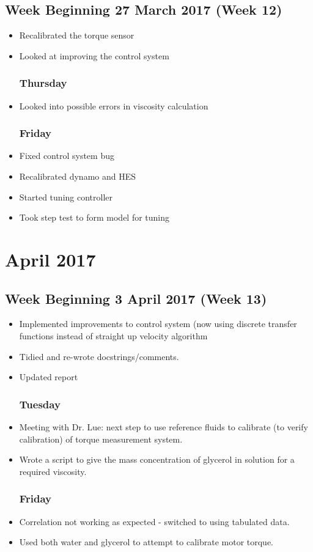 \documentclass[a4]{report}
\def\mon{\subsection*{Monday}}
\def\tue{\subsection*{Tuesday}}
\def\wed{\subsection*{Wednesday}}
\def\thu{\subsection*{Thursday}}
\def\fri{\subsection*{Friday}}
\begin{document}
	\section{Week Beginning 27 March 2017 (Week 12)}
	\begin{itemize}
		\wed
		\item Recalibrated the torque sensor
		\item Looked at improving the control system
		\thu
		\item Looked into possible errors in viscosity calculation
		\fri
		\item Fixed control system bug
		\item Recalibrated dynamo and HES
		\item Started tuning controller
		\item Took step test to form model for tuning
	\end{itemize}
	\newpage
	\chapter{April 2017}
	\section{Week Beginning 3 April 2017 (Week 13)}
	\begin{itemize}
		\mon
		\item Implemented improvements to control system (now using discrete transfer functions instead of straight up velocity algorithm
		\item Tidied and re-wrote docstrings/comments.
		\item Updated report
		\tue
		\item Meeting with Dr. Lue: next step to use reference fluids to calibrate (to verify calibration) of torque measurement system.
		\item Wrote a script to give the mass concentration of glycerol in solution for a required viscosity.
		\fri
		\item Correlation not working as expected - switched to using tabulated data.
		\item Used both water and glycerol to attempt to calibrate motor torque.
	\end{itemize}
	\newpage
\end{document}
